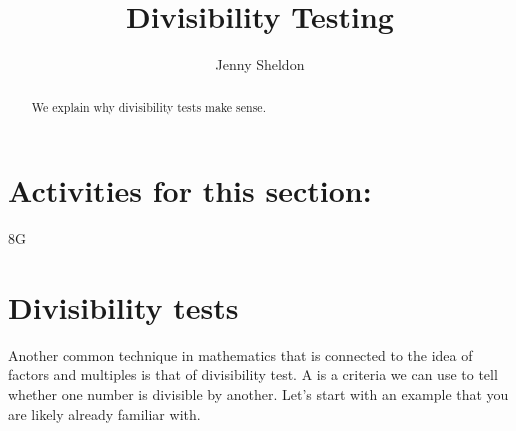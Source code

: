 \documentclass{ximera}
\title{Divisibility Testing}
\author{Jenny Sheldon}
\begin{document}
\begin{abstract}
We explain why divisibility tests make sense.
\end{abstract}
\maketitle

\section{Activities for this section:} 8G

\section{Divisibility tests}

Another common technique in mathematics that is connected to the idea of factors and multiples is that of divisibility test. A  is a criteria we can use to tell whether one number is divisible by another. Let's start with an example that you are likely already familiar with.
\end{document}
